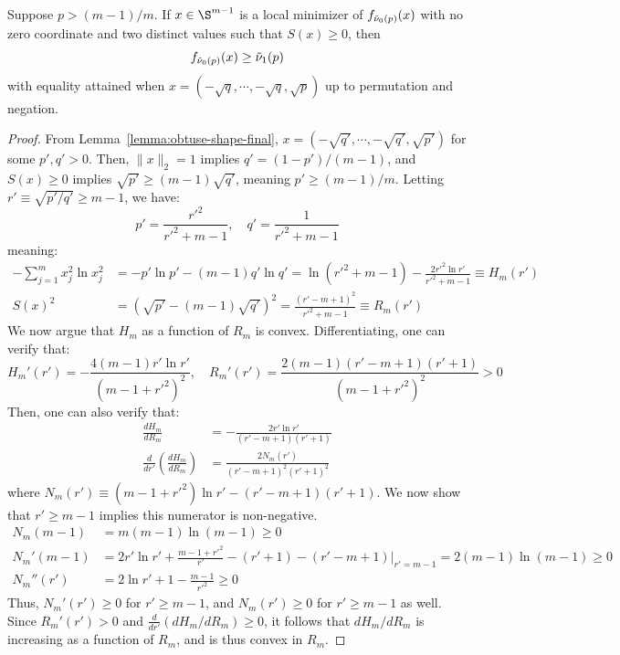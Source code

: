 \documentclass[11pt]{article}
\begin{document}
\begin{lemma}\label{lemma:obtuse-two}
   Suppose $p> (m-1)/m$. If $x\in \S^{m-1}$ is a local minimizer of $f_{{\Tilde \nu_0}(p)}(x)$ with no zero coordinate and two distinct values such that $S(x)\geq 0$, then
   \begin{equation}
       f_{{\Tilde \nu_0}(p)}(x)\geq {\Tilde \nu_1}(p)
   \end{equation}
   with equality attained when $x=(-\sqrt q ,\cdots,-\sqrt q,\sqrt p)$ up to permutation and negation.
\end{lemma}
\begin{proof}
    From Lemma~\ref{lemma:obtuse-shape-final}, $x=(-\sqrt {q'},\cdots,-\sqrt {q'},\sqrt {p'})$ for some $p',q'>0$. Then, $\|x\|_2=1$ implies $q'=(1-p')/(m-1)$, and $S(x)\geq 0$ implies $\sqrt{p'}\geq (m-1)\sqrt{q'}$, meaning $p'\geq (m-1)/m$. Letting $r'\equiv \sqrt{p'/q'}\geq m-1$, we have:
    \begin{equation}\label{eq:obtuse-pqr}
        p'=\frac{r'^2}{r'^2+m-1},\quad  q'=\frac{1}{r'^2+m-1}
    \end{equation}
    meaning:
    \begin{equation}
    \begin{aligned}
        -\sum_{j=1}^m x_j^2 \ln x_j^2 &=-p'\ln p' -(m-1)q'\ln q' =\ln (r'^2+m-1)-\frac{2r'^2\ln r'}{r'^2+m-1}\equiv H_m(r')\\
        S(x)^2&=(\sqrt {p'}-(m-1)\sqrt {q'})^2=\frac{(r'-m+1)^2}{r'^2+m-1}\equiv R_m(r')
    \end{aligned}
    \end{equation}
    We now argue that $H_m$ as a function of $R_m$ is convex. Differentiating, one can verify that:
    \begin{equation}
     H_m'(r')=-\frac{4(m-1)r' \ln r' }{(m-1+r'^2)^2},\quad 
          R_m'(r')=\frac{2(m-1)(r'-m+1)(r'+1)}{(m-1+r'^2)^2}>0
          \end{equation}
          Then, one can also verify that:
          \begin{align}\label{eq:obtuse-two-HmRm-slope}
       \frac{dH_m}{dR_m}&=-\frac{2r' \ln r' }{(r'-m+1)(r'+1)}\\
          \frac{d}{dr'}\left(\frac{dH_m}{dR_m}\right)&=\frac{2N_m(r')}{(r'-m+1)^2(r'+1)^2}
    \end{align}
    where $N_m(r')\equiv (m-1+r'^2)\ln r' -(r'-m+1)(r'+1)$. We now show that $r' \geq m-1$ implies this numerator is non-negative. 
    \begin{equation}
        \begin{aligned}
            N_m(m-1)&=m(m-1)\ln (m-1) \geq 0\\
            N_m'(m-1)&=2r' \ln r' +\frac{m-1+r'^2}{r' }-(r'+1)-(r'-m+1)\bigg|_{r'=m-1}=2(m-1)\ln (m-1)\geq 0\\
            N_m''(r')&=2\ln r' +1-\frac{m-1}{r'^2}\geq 0\quad
        \end{aligned}
    \end{equation}
    Thus, $N_m'(r')\geq 0$ for $r' \geq m-1$, and $N_m(r')\geq 0$ for $r' \geq m-1$ as well. Since $R_m'(r')>0$ and $\frac d {dr'}(dH_m/dR_m)\geq 0$, it follows that $dH_m/dR_m$ is increasing as a function of $R_m$, and is thus convex in $R_m$. 
    

\end{proof}
\end{document}
